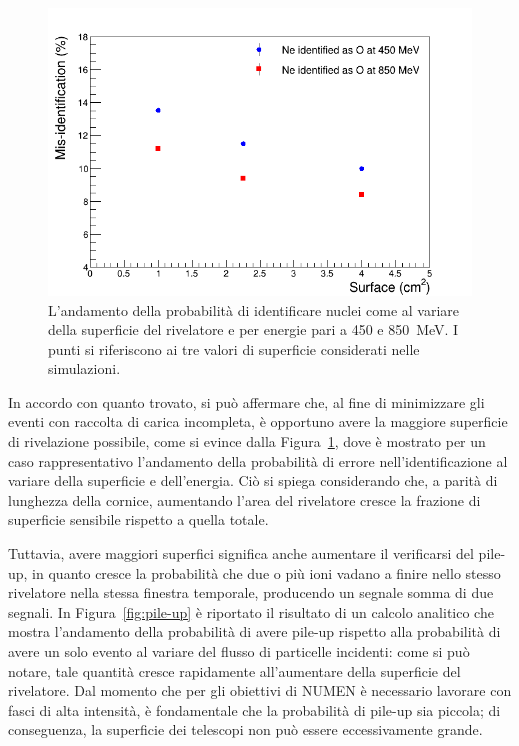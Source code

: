 \begin{figure} [!t]
	\centering
	\includegraphics[width=\textwidth, keepaspectratio]{Grafici_Tesi/Granularita/misident_surface2.png}
	\caption{L'andamento della probabilità di identificare nuclei  come  al variare della superficie del rivelatore e per energie pari a 450 e 850~MeV. I punti si riferiscono ai tre valori di superficie considerati nelle simulazioni.} \label{fig:misident_vs_surface}
\end{figure}




In accordo con quanto trovato, si può affermare che, al fine di minimizzare gli eventi con raccolta di carica incompleta, è opportuno avere la maggiore superficie di rivelazione possibile, come si evince dalla Figura~\ref{fig:misident_vs_surface}, dove è mostrato per un caso rappresentativo l'andamento della probabilità di errore nell'identificazione al variare della superficie e dell'energia.
Ciò si spiega considerando che, a parità di lunghezza della cornice, aumentando l'area del rivelatore cresce la frazione di superficie sensibile rispetto a quella totale.

Tuttavia, avere maggiori superfici significa anche aumentare il verificarsi del pile-up, in quanto cresce la probabilità che due o più ioni vadano a finire nello stesso rivelatore nella stessa finestra temporale, producendo un segnale somma di due segnali.
In Figura~\ref{fig:pile-up} è riportato il risultato di un calcolo analitico che mostra l'andamento della probabilità di avere pile-up rispetto alla probabilità di avere un solo evento al variare del flusso di particelle incidenti: come si può notare, tale quantità cresce rapidamente all'aumentare della superficie del rivelatore.
Dal momento che per gli obiettivi di NUMEN è necessario lavorare con fasci di alta intensità, è fondamentale che la probabilità di pile-up sia piccola; di conseguenza, la superficie dei telescopi non può essere eccessivamente grande.

